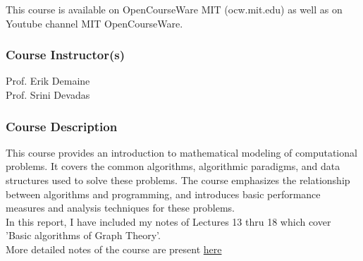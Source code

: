 \noindent
This course is available on OpenCourseWare MIT (ocw.mit.edu) as well as on Youtube channel MIT OpenCourseWare.\\
\subsubsection*{Course Instructor(s)}
Prof. Erik Demaine\\
Prof. Srini Devadas
\subsubsection*{Course Description}
This course provides an introduction to mathematical modeling of computational problems. It covers the common algorithms, algorithmic paradigms, and data structures used to solve these problems. The course emphasizes the relationship between algorithms and programming, and introduces basic performance measures and analysis techniques for these problems.\\
\vspace{1cm}
In this report, I have included my notes of Lectures 13 thru 18 which cover\\ 'Basic algorithms of Graph Theory'.\\
More detailed notes of the course are present \href{https://github.com/devansh-dvj/MIT-6.006-Fall-2011}{here}\\
